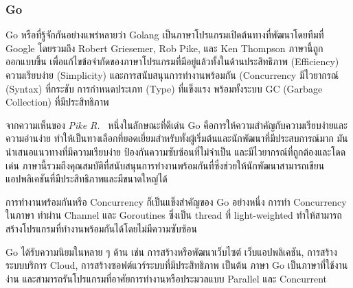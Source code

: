 \documentclass[12pt,oneside,openright,a4paper]{cpe-thai-project}
\begin{document}
        \subsubsection{Go}
            \begin{flushleft}
                Go หรือที่รู้จักกันอย่างแพร่หลายว่า Golang เป็นภาษาโปรแกรมเปิดต้นทางที่พัฒนาโดยทีมที่ Google โดยรวมถึง Robert Griesemer, Rob Pike, และ Ken Thompson ภาษานี้ถูกออกแบบขึ้น เพื่อแก้ไขข้อจำกัดของภาษาโปรแกรมที่มีอยู่แล้วทั้งในด้านประสิทธิภาพ (Efficiency) ความเรียบง่าย (Simplicity) และการสนับสนุนการทำงานพร้อมกัน (Concurrency มีไวยากรณ์ (Syntax) ที่กระชับ การกำหนดประเภท (Type) ที่แข็งแรง พร้อมทั้งระบบ GC (Garbage Collection) ที่มีประสิทธิภาพ~\cite{pike12go, donovan15go}
            \end{flushleft}
            \begin{flushleft}
                จากความเห็นของ \textit{Pike R.}~\cite{pike12go} หนึ่งในลักษณะที่ดีเด่น Go คือการให้ความสำคัญกับความเรียบง่ายและความอ่านง่าย ทำให้เป็นทางเลือกที่ยอดเยี่ยมสำหรับทั้งผู้เริ่มต้นและนักพัฒนาที่มีประสบการณ์มาก มันนำเสนอแนวทางที่มีความเรียบง่าย ป้องกันความซับซ้อนที่ไม่จำเป็น และมีไวยากรณ์ที่ถูกต้องและโดดเด่น ภาษานี้รวมถึงคุณสมบัติที่สนับสนุนการทำงานพร้อมกันที่ซึ่งช่วยให้นักพัฒนาสามารถเขียนแอปพลิเคชันที่มีประสิทธิภาพและมีขนาดใหญ่ได้
            \end{flushleft}
            \begin{flushleft}
                การทำงานพร้อมกันหรือ Concurrency ก็เป็นแข็งสำคัญของ Go อย่างหนึ่ง การทำ Concurrency ในภาษา ทำผ่าน Channel และ Goroutines ซึ่งเป็น thread ที่ light-weighted ทำให้สามารถสร้างโปรแกรมที่ทำงานพร้อมกันได้โดยไม่มีความซับซ้อน~\cite{donovan15go}
            \end{flushleft}
            \begin{flushleft}
                Go ได้รับความนิยมในหลาย ๆ ด้าน เช่น การสร้างหรือพัฒนาเว็บไซต์ เว็บแอปพลิเคชัน, การสร้างระบบบริการ Cloud, การสร้างซอฟต์แวร์ระบบที่มีประสิทธิภาพ เป็นต้น ภาษา Go เป็นภาษาที่ใช้งานง่าน และสามารถรันโปรแกรมที่อาศัยการทำงานหรือประมวลแบบ Parallel และ Concurrent~\cite{golangorg} 
            \end{flushleft}
\end{document}
